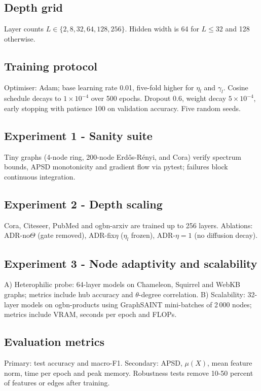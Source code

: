 \documentclass{article}
\begin{document}
\subsection{Depth grid}
Layer counts \(L \in \{2, 8, 32, 64, 128, 256\}\). Hidden width is 64 for \(L \le 32\) and 128 otherwise.

\subsection{Training protocol}
Optimiser: Adam; base learning rate 0.01, five-fold higher for \(\eta_l\) and \(\gamma_l\). Cosine schedule decays to \(1 \times 10^{-4}\) over 500 epochs. Dropout 0.6, weight decay \(5 \times 10^{-4}\), early stopping with patience 100 on validation accuracy. Five random seeds.

\subsection{Experiment 1 - Sanity suite}
Tiny graphs (4-node ring, 200-node Erd\H{o}s-R\'enyi, and Cora) verify spectrum bounds, APSD monotonicity and gradient flow via pytest; failures block continuous integration.

\subsection{Experiment 2 - Depth scaling}
Cora, Citeseer, PubMed and ogbn-arxiv are trained up to 256 layers. Ablations: ADR-no\(\Theta\) (gate removed), ADR-fix\(\eta\) (\(\eta_l\) frozen), ADR-\(\eta=1\) (no diffusion decay).

\subsection{Experiment 3 - Node adaptivity and scalability}
A) Heterophilic probe: 64-layer models on Chameleon, Squirrel and WebKB graphs; metrics include hub accuracy and \(\theta\)-degree correlation. B) Scalability: 32-layer models on ogbn-products using GraphSAINT mini-batches of 2\,000 nodes; metrics include VRAM, seconds per epoch and FLOPs.

\subsection{Evaluation metrics}
Primary: test accuracy and macro-F1. Secondary: APSD, \(\mu(X)\), mean feature norm, time per epoch and peak memory. Robustness tests remove 10-50 percent of features or edges after training.
\end{document}
